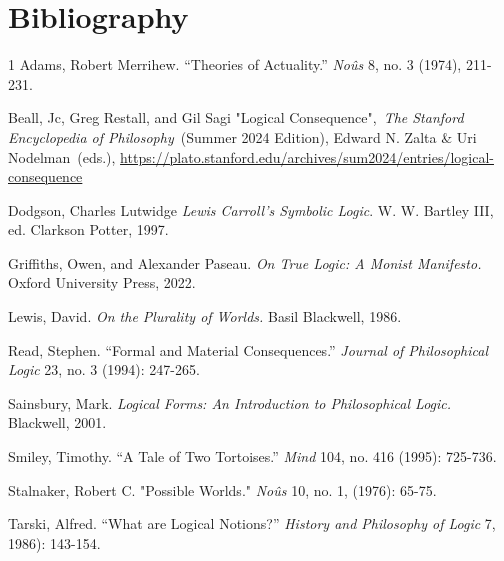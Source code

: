 \newpage  
\section*{Bibliography}


\begin{hangparas}{\hangingindent}{1}
Adams, Robert Merrihew. ``Theories of Actuality.'' \emph{Noûs} 8, no. 3
(1974), 211-231.

Beall, Jc, Greg Restall, and Gil Sagi "Logical Consequence",~\emph{The
Stanford Encyclopedia of Philosophy~}(Summer 2024 Edition), Edward N.
Zalta \& Uri Nodelman~(eds.),
\newline
\url{https://plato.stanford.edu/archives/sum2024/entries/logical-consequence}

Dodgson, Charles Lutwidge \emph{Lewis Carroll's Symbolic Logic}. W. W.
Bartley III, ed. Clarkson Potter, 1997.

Griffiths, Owen, and Alexander Paseau. \emph{On True Logic: A
Monist Manifesto.} Oxford University Press, 2022.

Lewis, David. \emph{On the Plurality of Worlds.} Basil Blackwell, 1986.

Read, Stephen. ``Formal and Material Consequences.'' \emph{Journal of Philosophical Logic} 23,
no. 3 (1994): 247-265.

Sainsbury, Mark. \emph{Logical Forms: An
Introduction to Philosophical Logic.} Blackwell, 2001.

Smiley, Timothy. ``A Tale of Two Tortoises.'' \emph{Mind} 104, no. 416 (1995):
725-736.

Stalnaker, Robert C. "Possible Worlds." \emph{Noûs} 10, no. 1, (1976): 65-75.

Tarski, Alfred. ``What are Logical Notions?''
\emph{History and Philosophy of Logic} 7, 1986): 143-154.
\end{hangparas}

